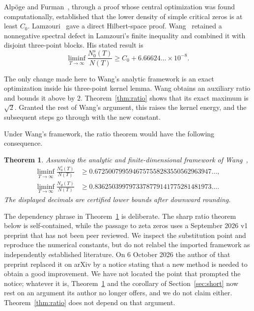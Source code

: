 \documentclass[11pt]{article}
\newtheorem{theorem}{Theorem}[section]
\theoremstyle{remark}
\begin{document}
Alp\"oge and Furman~\cite{AF}, through a proof whose central optimization was
found computationally, established that the lower density of simple critical
zeros is at least $C_0$.  Lamzouri~\cite{Lamzouri} gave a direct Hilbert-space
proof.  Wang~\cite{WangGlobal} retained a nonnegative spectral defect in
Lamzouri's finite inequality and combined it with disjoint three-point blocks.
His stated result is
\[
 \liminf_{T\to\infty}\frac{N_0^s(T)}{N(T)}
 \ge C_0+6.66624\ldots\times10^{-8}.
\]

The only change made here to Wang's analytic framework is an exact
optimization inside his three-point kernel lemma.  Wang obtains an auxiliary
ratio and bounds it above by $2$.  Theorem~\ref{thm:ratio} shows that its exact
maximum is $\sqrt2$.  Granted the rest of Wang's argument, this raises the
kernel energy, and the subsequent steps go through with the new constant.

Under Wang's framework, the ratio theorem would have the following consequence.

\begin{theorem}\label{thm:global}
Assuming the analytic and finite-dimensional framework of
Wang~\cite{WangGlobal},
\begin{align}
 \liminf_{T\to\infty}\frac{N_0^s(T)}{N(T)}
 &\ge
 0.6725007995946757558283550562963947\ldots,
 \label{eq:global-simple}\\
 \liminf_{T\to\infty}\frac{N_d(T)}{N(T)}
 &\ge
 0.8362503997973378779141775281481973\ldots .
 \label{eq:global-distinct}
\end{align}
The displayed decimals are certified lower bounds after downward rounding.
\end{theorem}

The dependency phrase in Theorem~\ref{thm:global} is deliberate.  The sharp
ratio theorem below is self-contained, while the passage to zeta zeros uses a
September 2026 v1 preprint that has not been peer reviewed.  We inspect the
substitution point and reproduce the numerical constants, but do not relabel
the imported framework as independently established literature.  On 6 October
2026 the author of that preprint replaced it on arXiv by a notice stating that
a new method is needed to obtain a good improvement.  We have not located the
point that prompted the notice; whatever it is, Theorem~\ref{thm:global} and
the corollary of Section~\ref{sec:short} now rest on an argument its author no
longer offers, and we do not claim either.  Theorem~\ref{thm:ratio} does not
depend on that argument.
\end{document}
